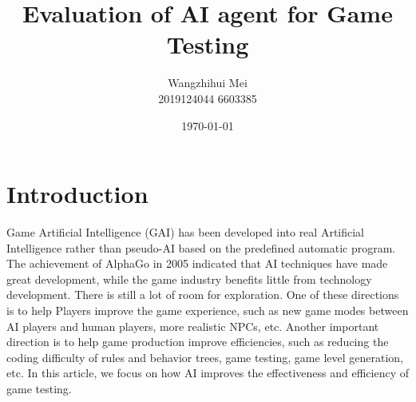 \documentclass[11pt,en,number]{elegantpaper}
\title{ Evaluation of AI agent for Game Testing}
\author{Wangzhihui Mei \\ 2019124044 6603385}
\institute{UOW-CCNU JI}
\date{\today}
\begin{document}
\maketitle

 


\section{Introduction}
\noindent
Game Artificial Intelligence (GAI) has been developed into real Artificial Intelligence rather than pseudo-AI based on the predefined automatic program. The achievement of AlphaGo in 2005 indicated that AI techniques have made great development, while the game industry benefits little from technology development. There is still a lot of room for exploration. One of these directions is to help Players improve the game experience, such as new game modes between AI players and human players, more realistic NPCs, etc. Another important direction is to help game production improve efficiencies, such as reducing the coding difficulty of rules and behavior trees, game testing, game level generation, etc. In this article, we focus on how AI improves the effectiveness and efficiency of game testing. 
\end{document}
